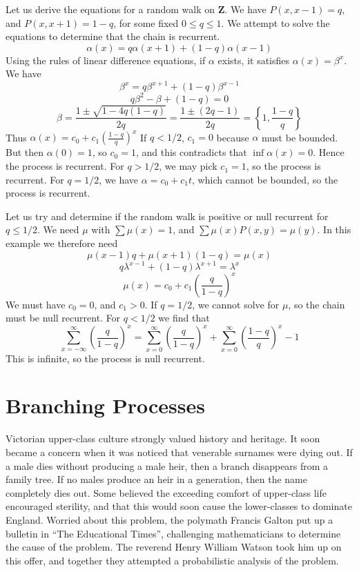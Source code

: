 \begin{example}
    Let us derive the equations for a random walk on $\mathbf{Z}$. We have $P(x,x-1) = q$, and $P(x,x+1) = 1-q$, for some fixed $0 \leq q \leq 1$. We attempt to solve the equations to determine that the chain is recurrent.
    \[ \alpha(x) = q \alpha(x+1) + (1 - q)\alpha(x-1) \]
    Using the rules of linear difference equations, if $\alpha$ exists, it satisfies $\alpha(x) = \beta^x$. We have
    \[ \beta^x = q\beta^{x+1} + (1-q)\beta^{x-1} \]
    \[ q\beta^2 - \beta + (1 - q) = 0 \]
    \[ \beta = \frac{1 \pm \sqrt{1 - 4q(1-q)}}{2q} = \frac{1 \pm (2q - 1)}{2q} = \left\{ 1, \frac{1-q}{q} \right\} \]
    Thus $\alpha(x) = c_0 + c_1 \left( \frac{1-q}{q} \right)^x$
    If $q < 1/2$, $c_1 = 0$ because $\alpha$ must be bounded. But then $\alpha(0) = 1$, so $c_0 = 1$, and this contradicts that $\inf \alpha(x) = 0$. Hence the process is recurrent. For $q > 1/2$, we may pick $c_1 = 1$, so the process is recurrent. For $q = 1/2$, we have $\alpha = c_0 + c_1 t$, which cannot be bounded, so the process is recurrent.

    Let us try and determine if the random walk is positive or null recurrent for $q \leq 1/2$. We need $\mu$ with $\sum \mu(x) = 1$, and $\sum \mu(x) P(x,y) = \mu(y)$. In this example we therefore need
    \[ \mu(x-1) q + \mu(x+1)(1 -q) = \mu(x) \]
    \[ q\lambda^{x-1} + (1 - q)\lambda^{x+1} = \lambda^x \]
    \[ \mu(x) = c_0 + c_1 \left( \frac{q}{1-q} \right)^x \]
    We must have $c_0 = 0$, and $c_1 > 0$. If $q = 1/2$, we cannot solve for $\mu$, so the chain must be null recurrent. For $q < 1/2$ we find that
    \[ \sum_{x = -\infty}^\infty \left( \frac{q}{1-q} \right)^x = \sum_{x = 0}^\infty \left( \frac{q}{1-q} \right)^x + \sum_{x = 0}^\infty \left( \frac{1-q}{q} \right)^x - 1 \]
    This is infinite, so the process is null recurrent.
\end{example}

\chapter{Branching Processes}

Victorian upper-class culture strongly valued history and heritage. It soon became a concern when it was noticed that venerable surnames were dying out. If a male dies without producing a male heir, then a branch disappears from a family tree. If no males produce an heir in a generation, then the name completely dies out. Some believed the exceeding comfort of upper-class life encouraged sterility, and that this would soon cause the lower-classes to dominate England. Worried about this problem, the polymath Francis Galton put up a bulletin in ``The Educational Times'', challenging mathematicians to determine the cause of the problem. The reverend Henry William Watson took him up on this offer, and together they attempted a probabilistic analysis of the problem.

